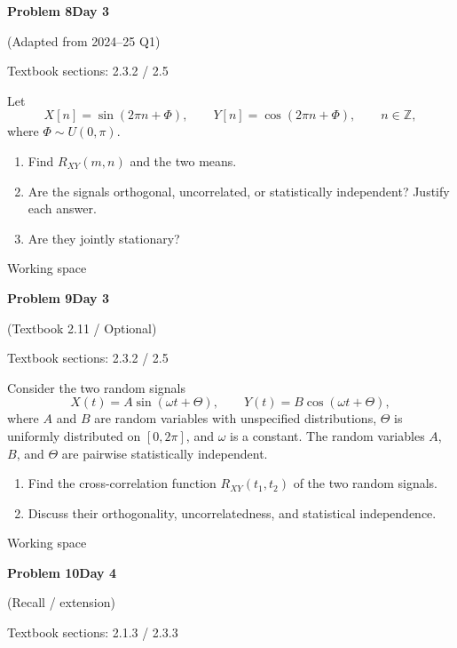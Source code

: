 \documentclass[11pt]{article}
\newcommand{\qtitle}[2]{\clearpage\begin{tcolorbox}[colback=navy,colframe=navy,arc=1.5pt,boxrule=0pt]\color{white}\large\bfseries #1\hfill\small #2\end{tcolorbox}}
\begin{document}
\qtitle{Problem 8}{Day 3}
{\small\color{accentred}(Adapted from 2024--25 Q1)}\par\smallskip
{\small\color{muted}Textbook sections: 2.3.2 / 2.5}\par\medskip
\begin{tcolorbox}[colback=qbg,colframe=qbg,boxrule=0pt]Let
\[X[n]=\sin(2\pi n+\Phi),\qquad Y[n]=\cos(2\pi n+\Phi),\qquad n\in\mathbb Z,\]
where $\Phi\sim U(0,\pi)$.
\begin{enumerate}\item Find $R_{XY}(m,n)$ and the two means.\item Are the signals orthogonal, uncorrelated, or statistically independent? Justify each answer.\item Are they jointly stationary?\end{enumerate}
\end{tcolorbox}\smallskip\begin{workspace}\hfill{\color{linec}\footnotesize Working space}\end{workspace}
\qtitle{Problem 9}{Day 3}
{\small\color{accentred}(Textbook 2.11 / Optional)}\par\smallskip
{\small\color{muted}Textbook sections: 2.3.2 / 2.5}\par\medskip
\begin{tcolorbox}[colback=qbg,colframe=qbg,boxrule=0pt]Consider the two random signals
\[
X(t)=A\sin(\omega t+\Theta),\qquad
Y(t)=B\cos(\omega t+\Theta),
\]
where $A$ and $B$ are random variables with unspecified distributions, $\Theta$ is uniformly distributed on $[0,2\pi]$, and $\omega$ is a constant. The random variables $A$, $B$, and $\Theta$ are pairwise statistically independent.
\begin{enumerate}
\item Find the cross-correlation function $R_{XY}(t_1,t_2)$ of the two random signals.
\item Discuss their orthogonality, uncorrelatedness, and statistical independence.
\end{enumerate}
\end{tcolorbox}\smallskip\begin{workspace}\hfill{\color{linec}\footnotesize Working space}\end{workspace}
\qtitle{Problem 10}{Day 4}
{\small\color{accentred}(Recall / extension)}\par\smallskip
{\small\color{muted}Textbook sections: 2.1.3 / 2.3.3}\par\medskip
\end{document}
